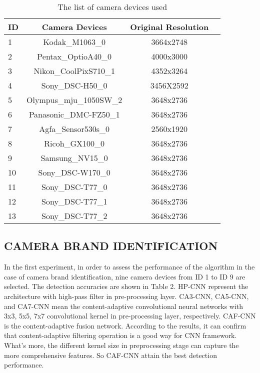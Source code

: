 \documentclass{article}
\begin{document}
\begin{table}
	\centering
	\caption{The list of camera devices used}
	\begin{tabular}{lccc}
		\hline
		ID & Camera Devices & Original Resolution\\ \hline
		1 & Kodak\_M1063\_0 & 3664x2748 \\ \hline
		2 & Pentax\_OptioA40\_0 & 4000x3000\\ \hline
		3 & Nikon\_CoolPixS710\_1 & 4352x3264  \\ \hline
		4 & Sony\_DSC-H50\_0 & 3456X2592\\ \hline
		5 & Olympus\_mju\_1050SW\_2 & 3648x2736\\ \hline
		6 & Panasonic\_DMC-FZ50\_1 & 3648x2736\\ \hline
		7 & Agfa\_Sensor530s\_0 & 2560x1920  \\ \hline
		8 & Ricoh\_GX100\_0 & 3648x2736\\ \hline
		9 & Samsung\_NV15\_0 & 3648x2736 \\ \hline
		10 & Sony\_DSC-W170\_0 & 3648x2736\\ \hline
		11 & Sony\_DSC-T77\_0 & 3648x2736 \\ \hline
		12 & Sony\_DSC-T77\_1 & 3648x2736\\ \hline
		13 & Sony\_DSC-T77\_2 & 3648x2736\\ \hline
		
	\end{tabular}

\end{table}

\subsection{CAMERA BRAND IDENTIFICATION}
\label{ssec:subhead}
In the first experiment, in order to assess the performance of the algorithm in the case of camera brand identification, nine camera devices from ID 1 to ID 9 are selected. The detection accuracies are shown in Table 2. HP-CNN represent the architecture with high-pass filter in pre-processing layer. CA3-CNN, CA5-CNN, and CA7-CNN mean the content-adaptive convolutional neural networks with 3x3, 5x5, 7x7 convolutional kernel in pre-processing layer, respectively. CAF-CNN is the content-adaptive fusion network. According to the results, it can confirm that content-adaptive filtering operation is a good way for CNN framework. What's more, the different kernel size in preprocessing stage can capture the more comprehensive features. So CAF-CNN attain the best detection performance.           
\end{document}
